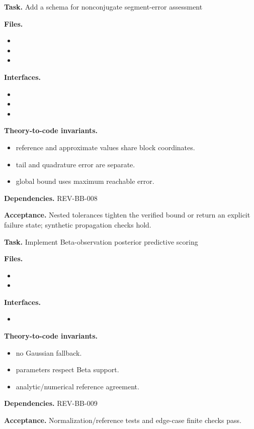 \begin{statusbox}[CODE-BB-005]
\textbf{Task.} Add a schema for nonconjugate segment-error assessment\par
\textbf{Files.}
\begin{itemize}[leftmargin=1.7em,itemsep=1.5pt,topsep=2pt]
\item {}
\item {}
\item {}
\end{itemize}
\textbf{Interfaces.}
\begin{itemize}[leftmargin=1.7em,itemsep=1.5pt,topsep=2pt]
\item {}
\item {}
\item {}
\end{itemize}
\textbf{Theory-to-code invariants.}
\begin{itemize}[leftmargin=1.7em,itemsep=1.5pt,topsep=2pt]
\item reference and approximate values share block coordinates.
\item tail and quadrature error are separate.
\item global bound uses maximum reachable error.
\end{itemize}
\textbf{Dependencies.} REV-BB-008\par
\textbf{Acceptance.} Nested tolerances tighten the verified bound or return an explicit failure state; synthetic propagation checks hold.
\end{statusbox}

\begin{statusbox}[CODE-BB-006]
\textbf{Task.} Implement Beta-observation posterior predictive scoring\par
\textbf{Files.}
\begin{itemize}[leftmargin=1.7em,itemsep=1.5pt,topsep=2pt]
\item {}
\item {}
\end{itemize}
\textbf{Interfaces.}
\begin{itemize}[leftmargin=1.7em,itemsep=1.5pt,topsep=2pt]
\item {}
\end{itemize}
\textbf{Theory-to-code invariants.}
\begin{itemize}[leftmargin=1.7em,itemsep=1.5pt,topsep=2pt]
\item no Gaussian fallback.
\item parameters respect Beta support.
\item analytic/numerical reference agreement.
\end{itemize}
\textbf{Dependencies.} REV-BB-009\par
\textbf{Acceptance.} Normalization/reference tests and edge-case finite checks pass.
\end{statusbox}

